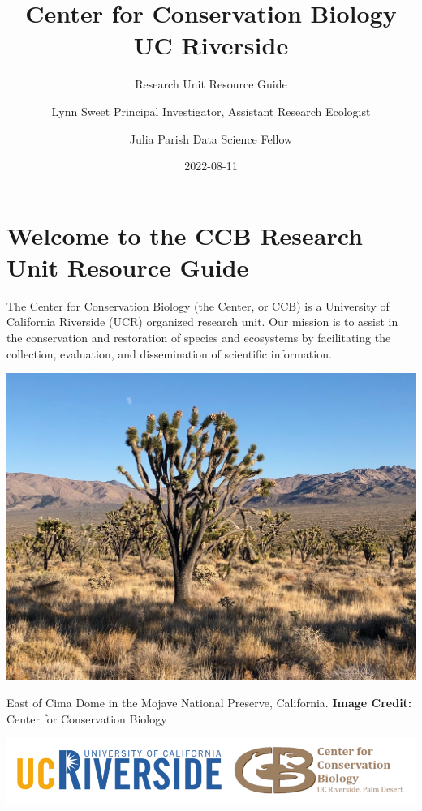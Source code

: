 \documentclass[
]{book}
\title{Center for Conservation Biology \textbar{} UC Riverside}
\subtitle{Research Unit Resource Guide}
\author{Lynn Sweet \textbar{} Principal Investigator, Assistant Research Ecologist \and Julia Parish \textbar{} Data Science Fellow}
\date{2022-08-11}
\begin{document}
\maketitle

{
\setcounter{tocdepth}{1}
\tableofcontents
}
\hypertarget{welcome-to-the-ccb-research-unit-resource-guide}{%
\chapter*{Welcome to the CCB Research Unit Resource Guide}\label{welcome-to-the-ccb-research-unit-resource-guide}}

The Center for Conservation Biology (the Center, or CCB) is a University of California Riverside (UCR) organized research unit. Our mission is to assist in the conservation and restoration of species and ecosystems by facilitating the collection, evaluation, and dissemination of scientific information.

\includegraphics[width=25.22in]{images/cima2019}

East of Cima Dome in the Mojave National Preserve, California.
\textbf{Image Credit:} Center for Conservation Biology

\begin{center}\includegraphics[width=12.85in]{images/ucrccb} \end{center}
\end{document}
